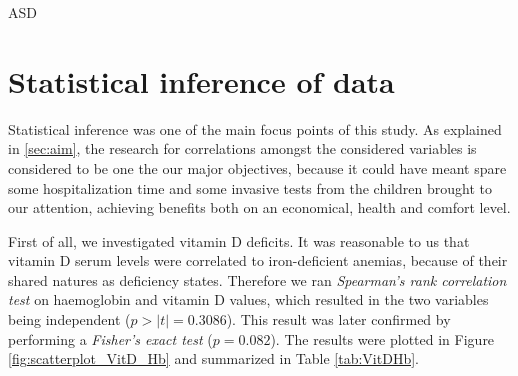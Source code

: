 
ASD

\section{Statistical inference of data}\label{sec:statisticalinference}
Statistical inference was one of the main focus points of this study. As explained in \ref{sec:aim}, the research for correlations amongst the considered variables is considered to be one the our major objectives, because it could have meant spare some hospitalization time and some invasive tests from the children brought to our attention, achieving benefits both on an economical, health and comfort level.

First of all, we investigated vitamin D deficits. It was reasonable to us that vitamin D serum levels were correlated to iron-deficient anemias, because of their shared natures as deficiency states. Therefore we ran \textit{Spearman's rank correlation test} on haemoglobin and vitamin D values, which resulted in the two variables being independent ($p>|t|=0.3086$). This result was later confirmed by performing a \textit{Fisher's exact test} ($p=0.082$). The results were plotted in Figure \ref{fig:scatterplot_VitD_Hb} and summarized in Table \ref{tab:VitDHb}.

